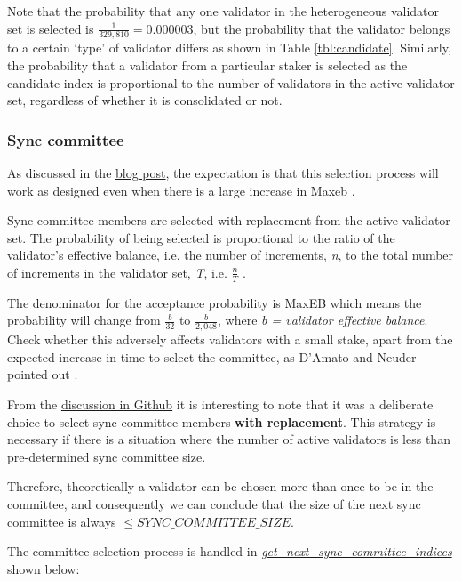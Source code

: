 Note that the probability that any one validator in the heterogeneous validator set is selected is $\frac{1}{329,810} = 0.000003$, but the probability that the validator belongs to a certain `type' of validator differs as shown in Table \ref{tbl:candidate}. Similarly, the probability that a validator from a particular staker is selected as the candidate index is proportional to the number of validators in the active validator set, regardless of whether it is consolidated or not.

\clearpage
\subsubsection*{Sync committee}
As discussed in the \href{https://ethresear.ch/t/increase-the-max-effective-balance-a-modest-proposal/15801/3}{blog post}, the expectation is that this selection process will work as designed even when there is a large increase in Max\gls{eb} \cite{Neuder2023a}.

Sync committee members are selected with replacement from the active validator set. The probability of being selected is proportional to the ratio of the validator's effective balance, i.e. the number of increments, \textit{n}, to the total number of increments in the validator set, \textit{T}, i.e. $\frac{n}{T}$ \cite{Edgington2023}. 

The denominator for the acceptance probability is MaxEB which means the probability will change from $\frac{b}{32}$ to $\frac{b}{2,048}$, where \textit{b = validator effective balance}. Check whether this adversely affects validators with a small stake, apart from the expected increase in time to select the committee, as D'Amato and Neuder pointed out \cite{damato2023}.

From the \href{https://github.com/ethereum/consensus-specs/pull/2130#discussion\_r532499943}{discussion in Github} it is interesting to note that it was a deliberate choice to select sync committee members \textbf{with replacement}. This strategy is necessary if there is a situation where the number of active validators is less than pre-determined sync committee size. 

Therefore, theoretically a validator can be chosen more than once to be in the committee, and consequently we can conclude that the size of the next sync committee is always $\leqslant SYNC\_COMMITTEE\_SIZE$.  

The committee selection process is handled in \href{https://eth2book.info/capella/part3/helper/accessors/#def\_get\_next\_sync\_committee\_indices}{\textit{get\_next\_sync\_committee\_indices}} \cite{Edgington2023} shown below: 

